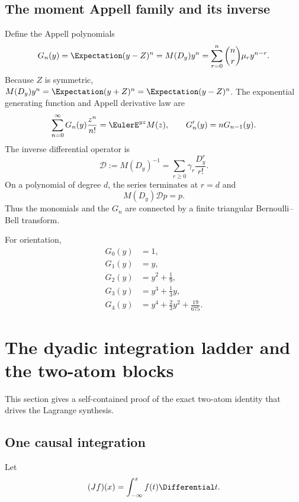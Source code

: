 \documentclass[11pt,oneside]{article}
\theoremstyle{definition}
\theoremstyle{remark}
\newcommand{\cD}{\mathcal D}
\begin{document}
\subsection{The moment Appell family and its inverse}
Define the Appell polynomials
\begin{equation}
 G_n(y)=\Expectation(y-Z)^n
 =M(D_y)y^n
 =\sum_{r=0}^{n}\binom nr\mu_r y^{n-r}.
 \label{eq:G-def}
\end{equation}
Because $Z$ is symmetric, $M(D_y)y^n=\Expectation(y+Z)^n=\Expectation(y-Z)^n$.
The exponential generating function and Appell derivative law are
\begin{equation}
 \sum_{n=0}^{\infty}G_n(y)\frac{z^n}{n!}
 =\EulerE^{yz}M(z),
 \qquad
 G_n'(y)=nG_{n-1}(y).
 \label{eq:G-egf}
\end{equation}
The inverse differential operator is
\begin{equation}
 \cD:=M(D_y)^{-1}
 =\sum_{r\ge0}\gamma_r\frac{D_y^r}{r!}.
 \label{eq:deconv-operator}
\end{equation}
On a polynomial of degree $d$, the series terminates at $r=d$ and
\begin{equation}
 M(D_y)\cD p=p.
 \label{eq:finite-inverse}
\end{equation}
Thus the monomials and the $G_n$ are connected by a finite triangular
Bernoulli--Bell transform.

For orientation,
\begin{align}
 G_0(y)&=1,\nonumber\\
 G_1(y)&=y,\nonumber\\
 G_2(y)&=y^2+\frac19,\nonumber\\
 G_3(y)&=y^3+\frac13y,\nonumber\\
 G_4(y)&=y^4+\frac23y^2+\frac{19}{675}.
 \label{eq:first-G}
\end{align}

\section{The dyadic integration ladder and the two-atom blocks}

This section gives a self-contained proof of the exact two-atom identity
that drives the Lagrange synthesis.

\subsection{One causal integration}
Let
\begin{equation}
 (Jf)(x)=\int_{-\infty}^{x}f(t)\Differential t.
 \label{eq:J-def}
\end{equation}
\end{document}
